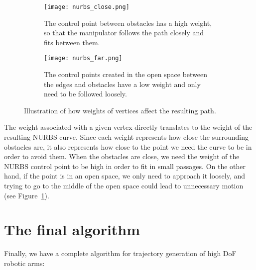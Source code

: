 \begin{figure}
  \centering
  \begin{subfigure}{.45\textwidth}
    \texttt{[image: nurbs\_close.png]}
    \caption{The control point between obstacles has a high weight, so that the manipulator follows the path closely and fits between them.}
  \end{subfigure}
  \begin{subfigure}{0.45\textwidth}
    \texttt{[image: nurbs\_far.png]}
    \caption{The control points created in the open space between the edges and obstacles have a low weight and only need to be followed loosely.}
  \end{subfigure}
  \caption{Illustration of how weights of vertices affect the resulting path.}\label{fig:nurb_paths}
\end{figure}

The weight associated with a given vertex directly translates to the weight of the resulting NURBS curve. Since each weight represents how close the surrounding obstacles are, it also represents how close to the point we need the curve to be in order to avoid them. When the obstacles are close, we need the weight of the NURBS control point to be high in order to fit in small passages. On the other hand, if the point is in an open space, we only need to approach it loosely, and trying to go to the middle of the open space could lead to unnecessary motion (see Figure~\ref{fig:nurb_paths}).

\section{The final algorithm}

Finally, we have a complete algorithm for trajectory generation of high DoF robotic arms:

